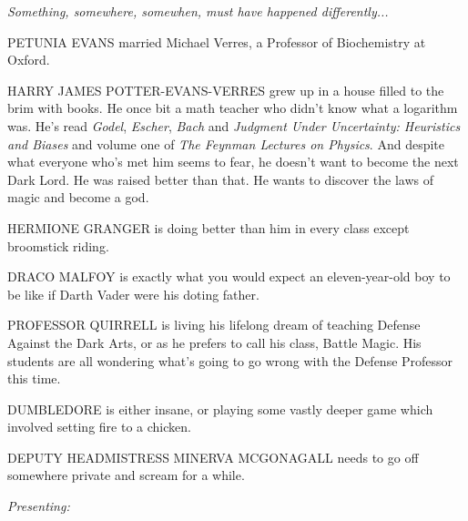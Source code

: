 {
    \setlength\parskip{1em plus 0.1em minus 0.2em}
    \setlength\parindent{0pt}

    \centerline{\textit{Something, somewhere, somewhen, must have happened differently...}}

    PETUNIA EVANS married Michael Verres, a Professor of Biochemistry at Oxford.

    HARRY JAMES POTTER-EVANS-VERRES grew up in a house filled to the brim with books. He once bit a math teacher who didn't know what a logarithm was. He's read \emph{Godel}, \emph{Escher}, \emph{Bach} and \emph{Judgment Under Uncertainty: Heuristics and Biases} and volume one of \emph{The Feynman Lectures on Physics}. And despite what everyone who's met him seems to fear, he doesn't want to become the next Dark Lord. He was raised better than that. He wants to discover the laws of magic and become a god.

    HERMIONE GRANGER is doing better than him in every class except broomstick riding.

    DRACO MALFOY is exactly what you would expect an eleven-year-old boy to be like if Darth Vader were his doting father.

    PROFESSOR QUIRRELL is living his lifelong dream of teaching Defense Against the Dark Arts, or as he prefers to call his class, Battle Magic. His students are all wondering what's going to go wrong with the Defense Professor this time.

    DUMBLEDORE is either insane, or playing some vastly deeper game which involved setting fire to a chicken.

    DEPUTY HEADMISTRESS MINERVA MCGONAGALL needs to go off somewhere private and scream for a while.

    \begin{center}
    \emph{Presenting:}
    \end{center}
}
